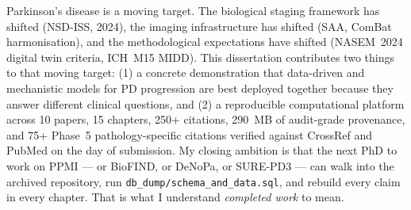 Parkinson's disease is a moving target. The biological staging framework has shifted (NSD-ISS, 2024), the imaging infrastructure has shifted (SAA, ComBat harmonisation), and the methodological expectations have shifted (NASEM~2024 digital twin criteria, ICH~M15 MIDD). This dissertation contributes two things to that moving target: (1) a concrete demonstration that data-driven and mechanistic models for PD progression are best deployed together because they answer different clinical questions, and (2) a reproducible computational platform across 10 papers, 15 chapters, 250+ citations, 290~MB of audit-grade provenance, and 75+ Phase~5 pathology-specific citations verified against CrossRef and PubMed on the day of submission. My closing ambition is that the next PhD to work on PPMI --- or BioFIND, or DeNoPa, or SURE-PD3 --- can walk into the archived repository, run \texttt{db\_dump/schema\_and\_data.sql}, and rebuild every claim in every chapter. That is what I understand \emph{completed work} to mean.
